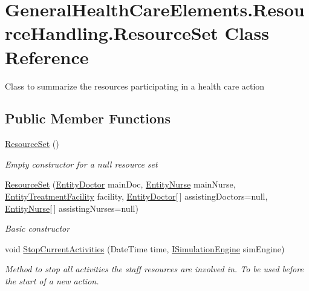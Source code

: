 \hypertarget{class_general_health_care_elements_1_1_resource_handling_1_1_resource_set}{}\section{General\+Health\+Care\+Elements.\+Resource\+Handling.\+Resource\+Set Class Reference}
\label{class_general_health_care_elements_1_1_resource_handling_1_1_resource_set}


Class to summarize the resources participating in a health care action  


\subsection*{Public Member Functions}
\begin{DoxyCompactItemize}
\item 
\hyperlink{class_general_health_care_elements_1_1_resource_handling_1_1_resource_set_a6defff70b8ce172714601b7b012ecb0c}{Resource\+Set} ()
\begin{DoxyCompactList}\small\item\em Empty constructor for a null resource set \end{DoxyCompactList}\item 
\hyperlink{class_general_health_care_elements_1_1_resource_handling_1_1_resource_set_a43637237cc38c6580ebab1c2aac445cc}{Resource\+Set} (\hyperlink{class_general_health_care_elements_1_1_entities_1_1_entity_doctor}{Entity\+Doctor} main\+Doc, \hyperlink{class_general_health_care_elements_1_1_entities_1_1_entity_nurse}{Entity\+Nurse} main\+Nurse, \hyperlink{class_general_health_care_elements_1_1_entities_1_1_entity_treatment_facility}{Entity\+Treatment\+Facility} facility, \hyperlink{class_general_health_care_elements_1_1_entities_1_1_entity_doctor}{Entity\+Doctor}\mbox{[}$\,$\mbox{]} assisting\+Doctors=null, \hyperlink{class_general_health_care_elements_1_1_entities_1_1_entity_nurse}{Entity\+Nurse}\mbox{[}$\,$\mbox{]} assisting\+Nurses=null)
\begin{DoxyCompactList}\small\item\em Basic constructor \end{DoxyCompactList}\item 
void \hyperlink{class_general_health_care_elements_1_1_resource_handling_1_1_resource_set_ac06701d613a37a580a7ae6c988d0c3a3}{Stop\+Current\+Activities} (Date\+Time time, \hyperlink{interface_simulation_core_1_1_simulation_classes_1_1_i_simulation_engine}{I\+Simulation\+Engine} sim\+Engine)
\begin{DoxyCompactList}\small\item\em Method to stop all activities the staff resources are involved in. To be used before the start of a new action. \end{DoxyCompactList}\end{DoxyCompactItemize}
